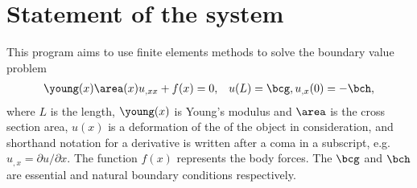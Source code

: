 \documentclass[twoside,a4paper,12pt,draft]{article}
\begin{document}

\tableofcontents


\listoffigures
\listoftables




\section{Statement of the system}

This program aims to use finite elements methods to solve the boundary
value problem
%
\begin{align}
  \young(x) \area(x) u_{,xx} + f(x) = 0, \label{eq:bvp}
  &&u(L) = \bcg, u_{,x}(0) = -\bch,
\end{align}
where $L$ is the length, $\young(x)$ is Young's modulus and $\area$ is
the cross section area, $u(x)$ is a deformation of the of the object
in consideration, and shorthand notation for a derivative is written
after a coma in a subscript, e.g. $u_{,x} = \partial u /\partial x$.  The
function $f(x)$ represents the body forces. The $\bcg$ and $\bch$ are
essential and natural boundary conditions respectively.
\end{document}
